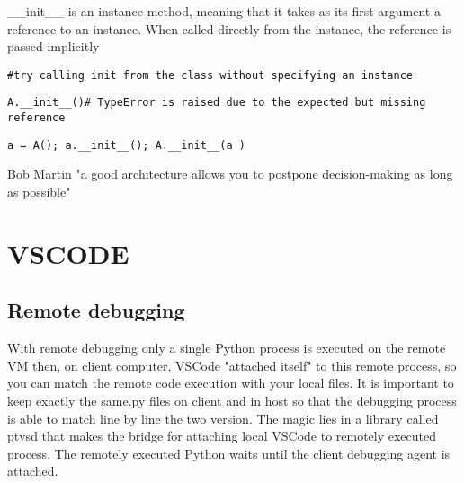 \documentclass{article}
\begin{document}
\_\_init\_\_ is an instance method, meaning that it takes as its first argument a reference to an instance. When called directly from the instance, the reference is passed implicitly

\texttt{\#try calling init from the class without specifying an instance}

\texttt{A.\_\_init\_\_()\# TypeError is raised due to the expected but missing reference}

\texttt{a = A(); a.\_\_init\_\_(); A.\_\_init\_\_(a  )}


Bob Martin "a good architecture allows you to postpone decision-making as long as possible"
\section{VSCODE}
\subsection*{Remote debugging}
With remote debugging only a single Python process is executed on the remote VM then, on client computer, VSCode "attached itself" to this remote process, so you can match the remote code execution with your local files. It is important to keep exactly the same.py files on client and in host so that the debugging process is able to match line by line the two version.
The magic lies in a library called ptvsd that makes the bridge for attaching local VSCode to remotely executed process. The remotely executed Python waits until the client debugging agent is attached.
\end{document}
